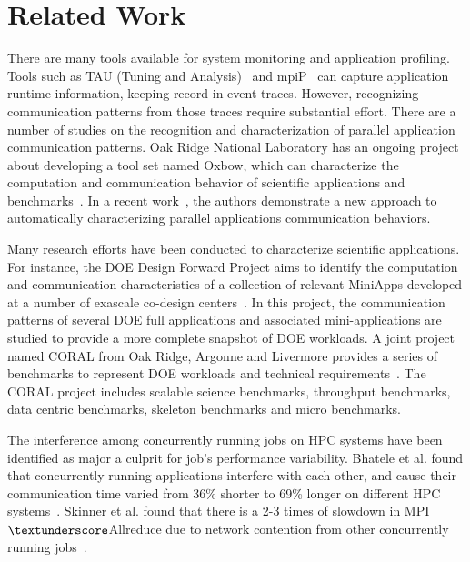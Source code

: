 \section{Related Work}
\label{sec:related_work}

There are many tools available for system monitoring and application profiling. 
Tools such as TAU (Tuning and Analysis)~\cite{tau} and mpiP~\cite{mpip} can capture 
application runtime information, keeping record in event traces. 
However, recognizing communication patterns from those traces require substantial effort. 
There are a number of studies on the recognition and characterization of parallel application communication patterns. 
Oak Ridge National Laboratory has an ongoing project about developing a tool set named Oxbow, 
which can characterize the computation and communication behavior of scientific applications and benchmarks~\cite{oxbow}. 
In a recent work~\cite{roth}, 
the authors demonstrate a new approach to automatically characterizing parallel applications communication behaviors. 


Many research efforts have been conducted to characterize scientific applications. 
For instance, the DOE Design Forward Project aims to identify the 
computation and communication characteristics of a collection of relevant 
MiniApps developed at a number of exascale co-design centers~\cite{designforwardwebpage}. 
In this project, the communication patterns of several DOE full applications and associated 
mini-applications are studied to provide a more complete snapshot of DOE workloads. 
A joint project named CORAL from Oak Ridge, Argonne and Livermore provides a series of 
benchmarks to represent DOE workloads and technical requirements~\cite{coral}. 
The CORAL project includes scalable science benchmarks, throughput benchmarks, 
data centric benchmarks, skeleton benchmarks and micro benchmarks.  

The interference among concurrently running jobs on HPC systems 
have been identified as major a culprit for job's performance variability. 
Bhatele et al. found that concurrently running applications interfere with each other, 
and cause their communication time varied from 
36\% shorter to 69\% longer on different HPC systems~\cite{abhinav-sc13}. 
Skinner et al. found that  there is a 2-3 times of slowdown in MPI$\textunderscore$Allreduce 
due to network contention from other concurrently running jobs~\cite{skinner}. 

